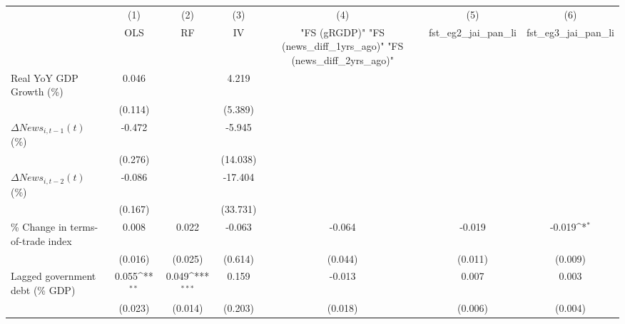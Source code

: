 {
\def\sym#1{\ifmmode^{#1}\else\(^{#1}\)\fi}
\begin{tabular}{l*{6}{c}}
\toprule
                    &\multicolumn{1}{c}{(1)}&\multicolumn{1}{c}{(2)}&\multicolumn{1}{c}{(3)}&\multicolumn{1}{c}{(4)}&\multicolumn{1}{c}{(5)}&\multicolumn{1}{c}{(6)}\\
                    &\multicolumn{1}{c}{OLS}&\multicolumn{1}{c}{RF}&\multicolumn{1}{c}{IV}&\multicolumn{1}{c}{ "FS (gRGDP)"  "FS (news_diff_1yrs_ago)"  "FS (news_diff_2yrs_ago)" }&\multicolumn{1}{c}{fst_eg2_jai_pan_li}&\multicolumn{1}{c}{fst_eg3_jai_pan_li}\\
\midrule
Real YoY GDP Growth (\%)&       0.046         &                     &       4.219         &                     &                     &                     \\
                    &     (0.114)         &                     &     (5.389)         &                     &                     &                     \\
\addlinespace
$ \Delta News_{i,t-1}(t)$ (\%)&      -0.472         &                     &      -5.945         &                     &                     &                     \\
                    &     (0.276)         &                     &    (14.038)         &                     &                     &                     \\
\addlinespace
$ \Delta News_{i,t-2}(t)$ (\%)&      -0.086         &                     &     -17.404         &                     &                     &                     \\
                    &     (0.167)         &                     &    (33.731)         &                     &                     &                     \\
\addlinespace
\% Change in terms-of-trade index&       0.008         &       0.022         &      -0.063         &      -0.064         &      -0.019         &      -0.019\sym{*}  \\
                    &     (0.016)         &     (0.025)         &     (0.614)         &     (0.044)         &     (0.011)         &     (0.009)         \\
\addlinespace
Lagged government debt (\% GDP)&       0.055\sym{**} &       0.049\sym{***}&       0.159         &      -0.013         &       0.007         &       0.003         \\
                    &     (0.023)         &     (0.014)         &     (0.203)         &     (0.018)         &     (0.006)         &     (0.004)         \\

\end{tabular}}
